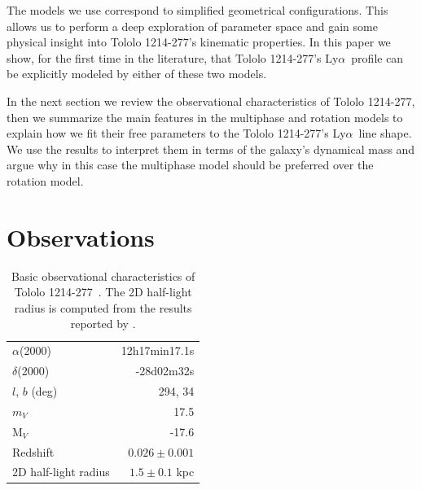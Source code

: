 \documentclass[a4paper,fleqn,usenatbib]{mnras}
\newcommand{\tol}{Tololo 1214-277}
\newcommand{\lya}{\ifmmode{{\rm Ly}\alpha}\else Ly$\alpha$\ \fi}
\begin{document}
The models we use correspond to simplified geometrical configurations.
This allows us to perform a deep exploration of parameter space and
gain some physical insight into \tol's kinematic properties.
In this paper we show, for the first time in the literature, that \tol's
\lya profile can be explicitly modeled by either of these two
models. 

In the next section we review the observational characteristics of
\tol, then we summarize the main features in the multiphase and
rotation models to explain how we fit their free parameters 
to the \tol's \lya line shape.
We use the results to interpret them in terms of the galaxy's
dynamical mass and argue why in this case the multiphase model should
be preferred over the rotation model.

\section{Observations}


\begin{table}
\begin{center}
\begin{tabular}{lr}\hline
$\alpha$(2000)& 12h17min17.1s\\
$\delta$(2000)& -28d02m32s\\
$l$, $b$ (deg) & 294, 34\\
$m_V$ & 17.5\\
  M$_V$ & -17.6\\ 
Redshift & $0.026\pm0.001$ \\
2D half-light radius  & $1.5\pm 0.1$ kpc\\\hline
\end{tabular}
\end{center}
\caption{Basic observational characteristics of \tol\ 
  \citep{Thuan97}.
The 2D half-light radius is computed from the results reported by
\citet{2003A&A...410..481N}.  
\label{obstable}}
\end{table}
\end{document}
